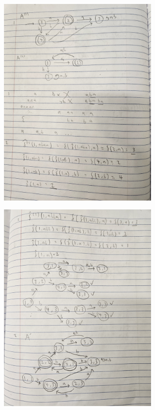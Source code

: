 \documentclass{article}
\theoremstyle{theorem}
\theoremstyle{definition}
\theoremstyle{remark}
\begin{document}
\begin{figure}[H]
    \centering
    \includegraphics[angle=-90, width=0.7\textwidth]{latexImages/hw3-1.1.jpg} 
\end{figure}

\begin{figure}[H]
    \centering
    \includegraphics[angle=-90, width=0.7\textwidth]{latexImages/hw3-1.2.jpg} 
\end{figure}
\end{document}
